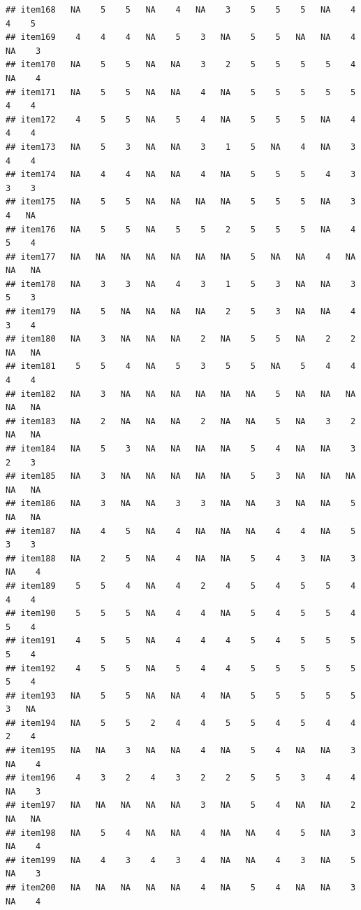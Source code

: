 \documentclass[
  man]{apa6}
\begin{document}
\begin{verbatim}
## item168   NA    5    5   NA    4   NA    3    5    5    5   NA    4    4    5
## item169    4    4    4   NA    5    3   NA    5    5   NA   NA    4   NA    3
## item170   NA    5    5   NA   NA    3    2    5    5    5    5    4   NA    4
## item171   NA    5    5   NA   NA    4   NA    5    5    5    5    5    4    4
## item172    4    5    5   NA    5    4   NA    5    5    5   NA    4    4    4
## item173   NA    5    3   NA   NA    3    1    5   NA    4   NA    3    4    4
## item174   NA    4    4   NA   NA    4   NA    5    5    5    4    3    3    3
## item175   NA    5    5   NA   NA   NA   NA    5    5    5   NA    3    4   NA
## item176   NA    5    5   NA    5    5    2    5    5    5   NA    4    5    4
## item177   NA   NA   NA   NA   NA   NA   NA    5   NA   NA    4   NA   NA   NA
## item178   NA    3    3   NA    4    3    1    5    3   NA   NA    3    5    3
## item179   NA    5   NA   NA   NA   NA    2    5    3   NA   NA    4    3    4
## item180   NA    3   NA   NA   NA    2   NA    5    5   NA    2    2   NA   NA
## item181    5    5    4   NA    5    3    5    5   NA    5    4    4    4    4
## item182   NA    3   NA   NA   NA   NA   NA   NA    5   NA   NA   NA   NA   NA
## item183   NA    2   NA   NA   NA    2   NA   NA    5   NA    3    2   NA   NA
## item184   NA    5    3   NA   NA   NA   NA    5    4   NA   NA    3    2    3
## item185   NA    3   NA   NA   NA   NA   NA    5    3   NA   NA   NA   NA   NA
## item186   NA    3   NA   NA    3    3   NA   NA    3   NA   NA    5   NA   NA
## item187   NA    4    5   NA    4   NA   NA   NA    4    4   NA    5    3    3
## item188   NA    2    5   NA    4   NA   NA    5    4    3   NA    3   NA    4
## item189    5    5    4   NA    4    2    4    5    4    5    5    4    4    4
## item190    5    5    5   NA    4    4   NA    5    4    5    5    4    5    4
## item191    4    5    5   NA    4    4    4    5    4    5    5    5    5    4
## item192    4    5    5   NA    5    4    4    5    5    5    5    5    5    4
## item193   NA    5    5   NA   NA    4   NA    5    5    5    5    5    3   NA
## item194   NA    5    5    2    4    4    5    5    4    5    4    4    2    4
## item195   NA   NA    3   NA   NA    4   NA    5    4   NA   NA    3   NA    4
## item196    4    3    2    4    3    2    2    5    5    3    4    4   NA    3
## item197   NA   NA   NA   NA   NA    3   NA    5    4   NA   NA    2   NA   NA
## item198   NA    5    4   NA   NA    4   NA   NA    4    5   NA    3   NA    4
## item199   NA    4    3    4    3    4   NA   NA    4    3   NA    5   NA    3
## item200   NA   NA   NA   NA   NA    4   NA    5    4   NA   NA    3   NA    4

\end{verbatim}
\end{document}
